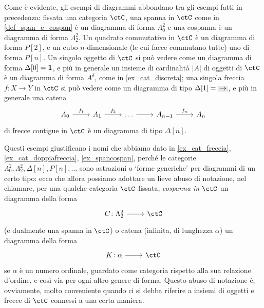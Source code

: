 \begin{remark}\label{tante_cose_sono_diag}
 Come è evidente, gli esempi di diagrammi abbondano tra gli esempi fatti in precedenza: fissata una categoria \(\ctC\), una spanna in \(\ctC\) come in \ref{def_span_e_cospan} è un diagramma di forma \(\Lambda^2_0\) e una cospanna è un diagramma di forma \(\Lambda^2_2\). Un quadrato commutativo in \(\ctC\) è un diagramma di forma \(P[2]\), e un cubo \(n\)-dimensionale (le cui facce commutano tutte) uno di forma \(P[n]\). Un singolo oggetto di \(\ctC\) si può vedere come un diagramma di forma \(\Delta[0]=\mathbf{1}\), e più in generale un insieme di cardinalità \(|A|\) di oggetti di \(\ctC\) è un diagramma di forma \(A^\delta\), come in \ref{ex_cat_discreta}; una singola freccia \(f \colon X\to Y\) in \(\ctC\) si può vedere come un diagramma di tipo \(\Delta[1] = \genArrow\), e più in generale una catena
 \[\begin{tikzcd}
   A_0 \ar[r, "f_1"] & A_1 \ar[r, "f_2"] & \dots \ar[r] & A_{n-1} \ar[r, "f_n"] & A_n
  \end{tikzcd}
 \]
 di frecce contigue in \(\ctC\) è un diagramma di tipo \(\Delta[n]\).

 Questi esempi giustificano i nomi che abbiamo dato in \ref{ex_cat_freccia}, \ref{ex_cat_doppiafreccia}, \ref{ex_spancospan}, perché le categorie \(\Lambda^2_0,\Lambda^2_2,\Delta[n], P[n], \dots\)  sono astrazioni o `forme generiche' per diagrammi di un certo tipo: ecco che allora possiamo adottare un lieve abuso di notazione, nel chiamare, per una qualche categoria \(\ctC\) fissata, \emph{cospanna in \(\ctC\)} un diagramma della forma
 \[\dmFun C{\Lambda^2_2}\ctC\]
 (e dualmente una spanna in \(\ctC\)) o catena (infinita, di lunghezza \(\alpha\)) un diagramma della forma
 \[\dmFun K\alpha\ctC\]
 se \(\alpha\) è un numero ordinale, guardato come categoria rispetto alla sua relazione d'ordine, e così via per ogni altro genere di forma. Questo abuso di notazione è, ovviamente, molto conveniente quando ci si debba riferire a insiemi di oggetti e frecce di \(\ctC\) connessi a una certa maniera.
\end{remark}

